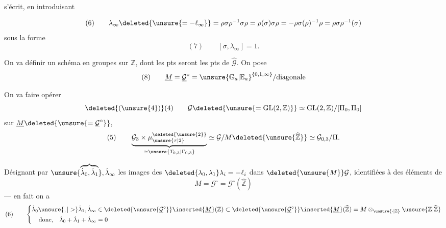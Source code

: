

s'écrit, en introduisant


\[
(6)\qquad
\lambda_\infty\deleted{\unsure{=-\ell_\infty}}
=\rho\sigma\rho^{-1}\sigma\rho
=\rho(\sigma)\sigma\rho
=-\rho\sigma(\rho)^{-1}\rho
=\rho\sigma\rho^{-1}(\sigma)
\]
sous la forme
\[
(7)\qquad [\sigma,\lambda_\infty]=1.
\]


On va définir un schéma en groupes  sur $\mathbb{Z}$, dont les pts seront  les pts de $\widehat{\mathcal{G}}$. On pose
\[
(8)\qquad
\underline{M}=\underline{\mathcal{G}}^{\circ}
=\unsure{\mathbb{G}_a|\mathbb{E}_a}^{\{0,1,\infty\}}/\text{diagonale}
\]

On va faire opérer 
\[
\deleted{(\unsure{4})}(4)\qquad
\mathcal{G}\deleted{\unsure{=\operatorname{GL}(2,\mathbb{Z})}}
\simeq\operatorname{GL}(2,\mathbb{Z})/[\Pi_0,\Pi_0]
\]
sur $\underline{M}\deleted{\unsure{=\underline{\mathcal{G}}^{\circ}}}$,
 
\[
(5)\qquad
\underbrace{\mathcal{G}_3\times\mu_{\unsure{\tau|2}}^{\deleted{\unsure{2}}}}_{\simeq\unsure{T_{0,3}|\Gamma_{0,3}}}
\simeq\mathcal{G}/M\deleted{\unsure{\widehat{\mathbb{Z}}}}
\simeq\mathcal{G}_{0,3}/\Pi.
\]

Désignant par $\unsure{\overbrace{\dot{\lambda}_0,\dot{\lambda}_1}},\dot{\lambda}_\infty$ les images des
$\deleted{\lambda_0,\lambda_1}\lambda_i=-\ell_i$ dans $\deleted{\unsure{M}}\mathcal{G}$, identifiées à des éléments de
\[
M=\mathcal{G}^{\circ}=\underline{\mathcal{G}}^{\circ}(\widehat{\mathbb{Z}})
\]
--- en fait on a
\[
(6)\qquad
\left\{
\begin{aligned}
\dot{\lambda}_0\unsure{,|>}\dot{\lambda}_1,\dot{\lambda}_\infty
&\in\deleted{\unsure{\underline{\mathcal{G}}^{\circ}}}\inserted{\underline{M}}(\mathbb{Z})
\subset\deleted{\unsure{\underline{\mathcal{G}}^{\circ}}}\inserted{\underline{M}}(\widehat{\mathbb{Z}})
=M\otimes_{\unsure{\cdot|\mathbb{Z}}}\unsure{\mathbb{Z}|\widehat{\mathbb{Z}}}\\
\text{donc,}\quad\dot{\lambda}_0+\dot{\lambda}_1+\dot{\lambda}_\infty&=0
\end{aligned}\right.
\]

